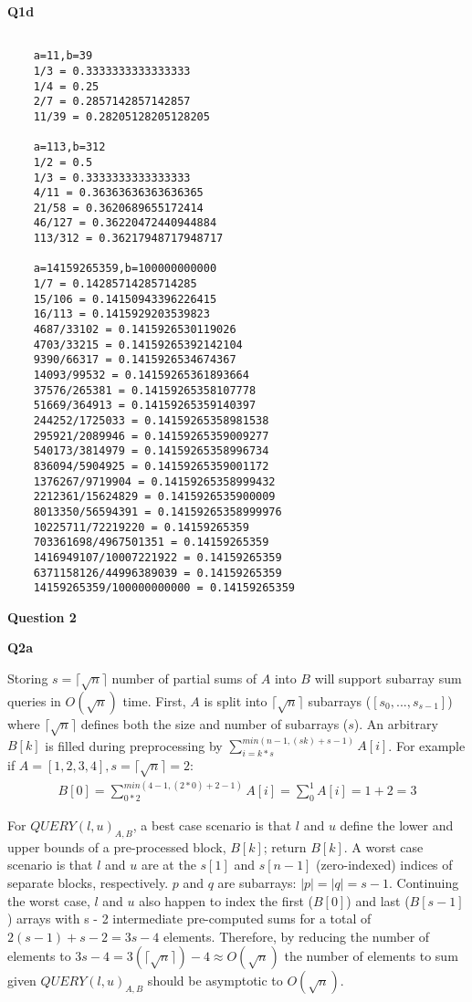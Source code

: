 \documentclass{article}
\begin{document}
\textbf{Q1d}

\begin{verbatim}

    a=11,b=39
    1/3 = 0.3333333333333333
    1/4 = 0.25
    2/7 = 0.2857142857142857
    11/39 = 0.28205128205128205

    a=113,b=312
    1/2 = 0.5
    1/3 = 0.3333333333333333
    4/11 = 0.36363636363636365
    21/58 = 0.3620689655172414
    46/127 = 0.36220472440944884
    113/312 = 0.36217948717948717

    a=14159265359,b=100000000000
    1/7 = 0.14285714285714285
    15/106 = 0.14150943396226415
    16/113 = 0.1415929203539823
    4687/33102 = 0.1415926530119026
    4703/33215 = 0.14159265392142104
    9390/66317 = 0.1415926534674367
    14093/99532 = 0.14159265361893664
    37576/265381 = 0.14159265358107778
    51669/364913 = 0.14159265359140397
    244252/1725033 = 0.14159265358981538
    295921/2089946 = 0.14159265359009277
    540173/3814979 = 0.14159265358996734
    836094/5904925 = 0.14159265359001172
    1376267/9719904 = 0.14159265358999432
    2212361/15624829 = 0.1415926535900009
    8013350/56594391 = 0.14159265358999976
    10225711/72219220 = 0.14159265359
    703361698/4967501351 = 0.14159265359
    1416949107/10007221922 = 0.14159265359
    6371158126/44996389039 = 0.14159265359
    14159265359/100000000000 = 0.14159265359

\end{verbatim}
 
\textbf{Question 2}

\textbf{Q2a}

Storing $s = \lceil\sqrt{n}\rceil$ number of partial sums of $A$ 
into $B$ will support subarray sum queries in $O(\sqrt{n})$ time. First, 
$A$ is split into $\lceil\sqrt{n}\rceil$ subarrays ($[s_{0}, ...,s_{s-1}]$) where 
$\lceil\sqrt{n}\rceil$ defines both the size and number of subarrays ($s$).
An arbitrary $B[k]$ is filled during preprocessing by 
$\sum_{i=k*s}^{min(n-1,(sk)+s-1)} A[i]$. For example if $A=[1,2,3,4], s=\lceil\sqrt{n}\rceil = 2$:
\begin{align*}
    B[0] = \sum_{0*2}^{min(4-1,(2*0)+2-1)} A[i] = \sum_{0}^{1} A[i] = 1 + 2 = 3
\end{align*}

For $QUERY(l,u)_{A,B}$, a best case scenario is that $l$ and $u$ define the lower and upper bounds 
of a pre-processed block, $B[k]$; return $B[k]$. A worst case scenario is
that $l$ and $u$ are at the $s[1]$ and $s[n-1]$ (zero-indexed) indices of separate blocks, respectively. 
$p$ and $q$ are subarrays:  $|p| = |q| = s - 1$. 
Continuing the worst case, $l$ and $u$ also happen to index the first ($B[0]$)
and last ($B[s-1]$) arrays with s - 2 intermediate pre-computed sums for a total 
of $2(s - 1) + s - 2 = 3s - 4$ elements. Therefore, by reducing the number of elements to  
$3s -4 = 3(\lceil\sqrt{n}\rceil) - 4 \approx O(\sqrt{n})$ the
number of elements to sum given $QUERY(l,u)_{A,B}$ should be asymptotic to $O(\sqrt{n})$.
\end{document}
